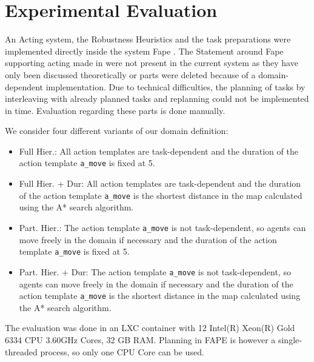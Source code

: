 \section{Experimental Evaluation}\label{sec:evaluation}

An Acting system, the Robustness Heuristics and the task preparations were implemented directly inside the system Fape \citep{bit-monnotFAPEConstraintbasedPlanner2020}.
The Statement around Fape supporting acting made in \cite{bit-monnotTemporalHierarchicalModels2016a} were not present in the current system as they have only been discussed theoretically or parts were deleted because of a domain-dependent implementation.
Due to technical difficulties, the planning of tasks by interleaving with already planned tasks and replanning could not be implemented in time.
Evaluation regarding these parts is done manually.

We consider four different variants of our domain definition:
\begin{itemize}
  \item Full Hier.: All action templates are task-dependent and the duration of the action template \verb|a_move| is fixed at 5.
  \item Full Hier. + Dur: All action templates are task-dependent and the duration of the action template \verb|a_move| is the shortest distance in the map calculated using the A* search algorithm. 
  \item Part. Hier.: The action template \verb|a_move| is not task-dependent, so agents can move freely in the domain if necessary and the duration of the action template \verb|a_move| is fixed at 5.
  \item Part. Hier. + Dur: The action template \verb|a_move| is not task-dependent, so agents can move freely in the domain if necessary and the duration of the action template \verb|a_move| is the shortest distance in the map calculated using the A* search algorithm. 
\end{itemize}

The evaluation was done in an LXC container with 12 Intel(R) Xeon(R) Gold 6334 CPU 3.60GHz Cores, 32 GB RAM.
Planning in FAPE is however a single-threaded process, so only one CPU Core can be used.





